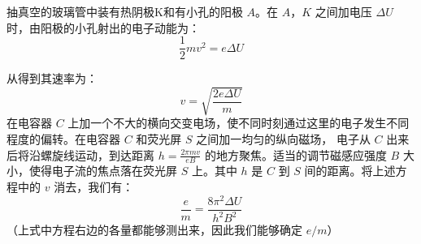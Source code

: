 抽真空的玻璃管中装有热阴极K和有小孔的阳极 $A$。在 $A$，$K$ 之间加电压 $\Delta U$ 时，由阳极的小孔射出的电子动能为：
\begin{equation}
\frac{1}{2}mv^2=e\Delta U
\end{equation}

从得到其速率为：
\begin{equation}
v=\sqrt{\frac{2e\Delta U}{m}}
\end{equation}
在电容器 $C$ 上加一个不大的横向交变电场，使不同时刻通过这里的电子发生不同程度的偏转。在电容器 $C$ 和荧光屏 $S$ 之间加一均匀的纵向磁场， 电子从 $C$ 出来后将沿螺旋线运动，到达距离 $h=\frac{2\pi mv}{eB}$ 的地方聚焦。适当的调节磁感应强度 $B$ 大小，使得电子流的焦点落在荧光屏 $S$ 上。其中 $h$ 是 $C$ 到 $S$ 间的距离。将上述方程中的 $v$ 消去，我们有：
\begin{equation}
\frac {e}{m}=\frac{8\pi ^2 \Delta U}{h^2 B^2}
\end{equation}
（上式中方程右边的各量都能够测出来，因此我们能够确定 $e/m$）
